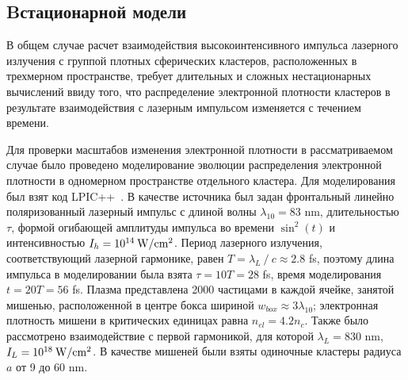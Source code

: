 \subsection*{B стационарной модели}

В общем случае расчет взаимодействия высокоинтенсивного импульса лазерного излучения с группой плотных сферических кластеров, расположенных в трехмерном пространстве, требует длительных и сложных нестационарных вычислений ввиду того, что распределение электронной плотности кластеров в результате взаимодействия с лазерным импульсом изменяется с течением времени.

Для проверки масштабов изменения электронной плотности в рассматриваемом случае было проведено моделирование эволюции распределения электронной плотности в одномерном пространстве отдельного кластера. Для моделирования был взят код LPIC++~\cite{Pfund1998}. В качестве источника был задан фронтальный линейно поляризованный лазерный импульс с длиной волны $\lambda_{10} = 83$ nm, длительностью $\tau$, формой огибающей амплитуды импульса во времени $\sin^2{(t)}$ и интенсивностью $I_{h} = 10^{14}\:\rm{W}/\rm{cm}^2$. Период лазерного излучения, соответствующий лазерной гармонике, равен $T = \lambda_{L}\:/\:c \approx 2.8$ fs, поэтому длина импульса в моделировании была взята $\tau = 10T = 28$ fs, время моделирования $t = 20T = 56$ fs. Плазма представлена 2000 частицами в каждой ячейке, занятой мишенью, расположенной в центре бокса шириной $w_{box} \approx 3\lambda_{10}$; электронная плотность мишени в критических единицах равна $n_{el} = 4.2 n_c$. Также было рассмотрено взаимодействие с первой гармоникой, для которой $\lambda_L = 830$ nm, $I_L = 10^{18}\:\rm{W}/\rm{cm}^2$. В качестве мишеней были взяты одиночные кластеры радиуса $a$ от 9 до 60 nm.





